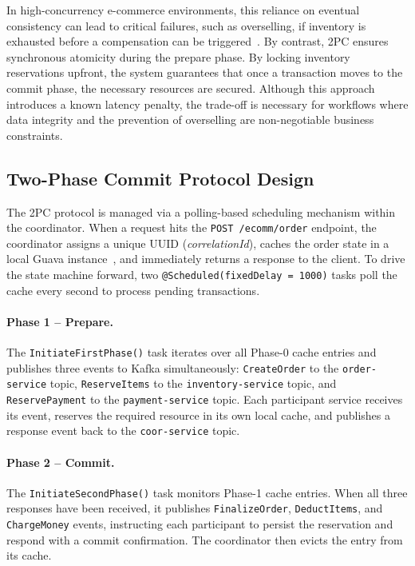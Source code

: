 \documentclass[]{USG}
\begin{document}
In high-concurrency e-commerce environments, this reliance on eventual consistency can lead to critical failures, such as overselling, if inventory is exhausted before a compensation can be triggered~\cite{carlson2013redis}. By contrast, 2PC ensures synchronous atomicity during the prepare phase. By locking inventory reservations upfront, the system guarantees that once a transaction moves to the commit phase, the necessary resources are secured. Although this approach introduces a known latency penalty, the trade-off is necessary for workflows where data integrity and the prevention of overselling are non-negotiable business constraints.

\subsection{Two-Phase Commit Protocol Design}
\label{subsec:2pc-protocol}

The 2PC protocol is managed via a polling-based scheduling mechanism within the coordinator. When a request hits the \texttt{POST /ecomm/order} endpoint, the coordinator assigns a unique UUID (\emph{correlationId}), caches the order state in a local Guava instance~\cite{guava2024}, and immediately returns a response to the client. To drive the state machine forward, two \texttt{@Scheduled(fixedDelay = 1000)} tasks poll the cache every second to process pending transactions.

\paragraph{Phase 1 -- Prepare.}
The \texttt{InitiateFirstPhase()} task iterates over all Phase-0 cache entries
and publishes three events to Kafka simultaneously:
\texttt{CreateOrder} to the \texttt{order-service} topic,
\texttt{ReserveItems} to the \texttt{inventory-service} topic, and
\texttt{ReservePayment} to the \texttt{payment-service} topic.
%
Each participant service receives its event, reserves the required resource
in its own local cache, and publishes a response event back to the
\texttt{coor-service} topic.

\paragraph{Phase 2 -- Commit.}
The \texttt{InitiateSecondPhase()} task monitors Phase-1 cache entries.
%
When all three responses have been received, it publishes \texttt{FinalizeOrder},
\texttt{DeductItems}, and \texttt{ChargeMoney} events, instructing each
participant to persist the reservation and respond with a commit confirmation.
%
The coordinator then evicts the entry from its cache.
\end{document}
